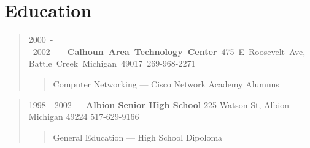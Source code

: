 \section*{Education}
\begin{quote}
\mbox{2000 - 2002 --- {\bf Calhoun Area Technology Center} 475 E Roosevelt Ave, Battle Creek Michigan 49017 269-968-2271}
\begin{quote}
Computer Networking --- Cisco Network Academy Alumnus
\end{quote}
\end{quote}
\begin{quote}
1998 - 2002 --- {\bf Albion Senior High School} 225 Watson St, Albion Michigan 49224 517-629-9166
\begin{quote}
General Education --- High School Dipoloma
\end{quote}
\end{quote}
